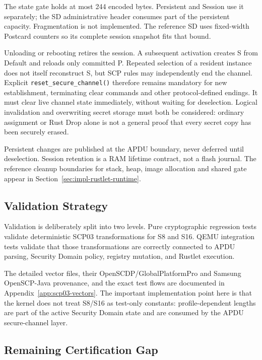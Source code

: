 The state gate holds at most 244 encoded bytes. Persistent and Session use
it separately; the SD administrative header consumes part of the persistent
capacity. Fragmentation is not implemented. The reference SD uses fixed-width
Postcard counters so its complete session snapshot fits that bound.

Unloading or rebooting retires the session. A subsequent activation creates
S from Default and reloads only committed P. Repeated selection of a resident
instance does not itself reconstruct S, but SCP rules may independently end
the channel. Explicit \texttt{reset\_secure\_channel()} therefore remains
mandatory for new establishment, terminating clear commands and other
protocol-defined endings. It must clear live channel state immediately,
without waiting for deselection. Logical invalidation and overwriting secret
storage must both be considered: ordinary assignment or Rust Drop alone is
not a general proof that every secret copy has been securely erased.

Persistent changes are published at the APDU boundary, never deferred until
deselection. Session retention is a RAM lifetime contract, not a flash
journal. The reference cleanup boundaries for stack, heap, image allocation
and shared gate appear in Section~\ref{sec:impl-rustlet-runtime}.

\subsection{Validation Strategy}
\label{sec:impl-scp-validation}

Validation is deliberately split into two levels. Pure cryptographic regression
tests validate deterministic SCP03 transformations for S8 and S16. QEMU
integration tests validate that those transformations are correctly connected
to APDU parsing, Security Domain policy, registry mutation, and Rustlet
execution.

The detailed vector files, their OpenSCDP/GlobalPlatformPro and Samsung
OpenSCP-Java provenance, and the exact test flows are documented in
Appendix~\ref{app:scp03-vectors}. The
important implementation point here is that the kernel does not treat S8/S16
as test-only constants: profile-dependent lengths are part of the active
Security Domain state and are consumed by the APDU secure-channel layer.

\subsection{Remaining Certification Gap}
\label{sec:impl-scp-certification-gap}

